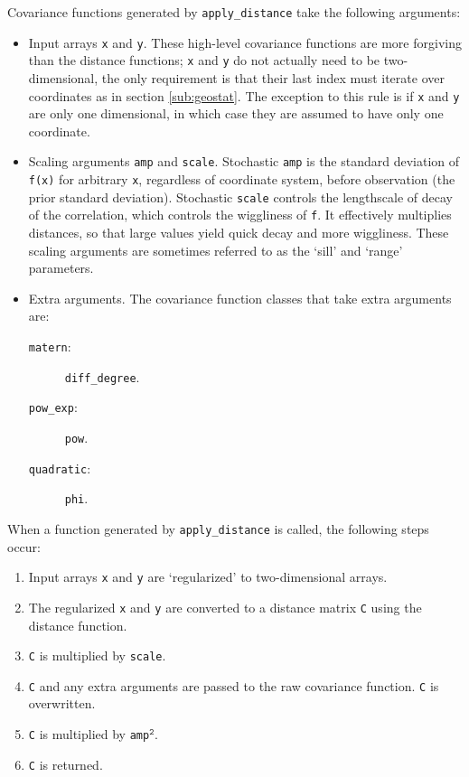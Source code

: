 \documentclass{manual}
\begin{document}
Covariance functions generated by \texttt{apply_distance} take the following arguments:
\begin{itemize}
    \item Input arrays \texttt{x} and \texttt{y}. These high-level covariance functions are more forgiving than the distance functions; \texttt{x} and \texttt{y} do not actually need to be two-dimensional, the only requirement is that their last index must iterate over coordinates as in section \ref{sub:geostat}. The exception to this rule is if \texttt{x} and \texttt{y} are only one dimensional, in which case they are assumed to have only one coordinate.
    \item Scaling arguments \texttt{amp} and \texttt{scale}. Stochastic \texttt{amp} is the standard deviation of \texttt{f(x)} for arbitrary \texttt{x}, regardless of coordinate system, before observation (the prior standard deviation). Stochastic \texttt{scale} controls the lengthscale of decay of the correlation, which controls the wiggliness of \texttt{f}. It effectively multiplies distances, so that large values yield quick decay and more wiggliness. These scaling arguments are sometimes referred to as the `sill' and `range' parameters.
    
    \item Extra arguments. The covariance function classes that take extra arguments are:
    \begin{description}
        \item[\texttt{matern}:] \texttt{diff_degree}.
        \item[\texttt{pow_exp}:] \texttt{pow}.
        \item[\texttt{quadratic}:] \texttt{phi}.
    \end{description}
\end{itemize}

When a function generated by \texttt{apply_distance} is called, the following steps occur:
\begin{enumerate}
    \item Input arrays \texttt{x} and \texttt{y} are `regularized' to two-dimensional arrays.
    \item The regularized \texttt{x} and \texttt{y} are converted to a distance matrix \texttt{C} using the distance function.
    \item \texttt{C} is multiplied by \texttt{scale}.
    \item \texttt{C} and any extra arguments are passed to the raw covariance function. \texttt{C} is overwritten.
    \item \texttt{C} is multiplied by \texttt{amp}$^\texttt{2}$.
    \item \texttt{C} is returned.
\end{enumerate}
\end{document}
